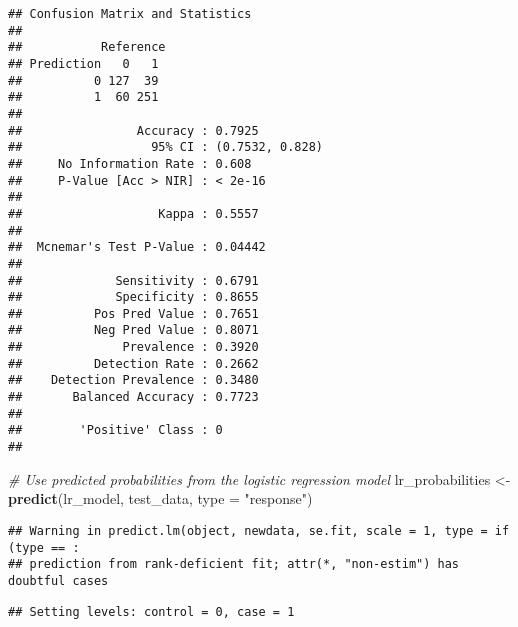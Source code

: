 \documentclass[
]{article}
\newenvironment{Shaded}{\begin{snugshade}}{\end{snugshade}}
\newcommand{\AttributeTok}[1]{\textcolor[rgb]{0.13,0.29,0.53}{#1}}
\newcommand{\CommentTok}[1]{\textcolor[rgb]{0.56,0.35,0.01}{\textit{#1}}}
\newcommand{\FloatTok}[1]{\textcolor[rgb]{0.00,0.00,0.81}{#1}}
\newcommand{\FunctionTok}[1]{\textcolor[rgb]{0.13,0.29,0.53}{\textbf{#1}}}
\newcommand{\NormalTok}[1]{#1}
\newcommand{\OtherTok}[1]{\textcolor[rgb]{0.56,0.35,0.01}{#1}}
\newcommand{\SpecialCharTok}[1]{\textcolor[rgb]{0.81,0.36,0.00}{\textbf{#1}}}
\newcommand{\StringTok}[1]{\textcolor[rgb]{0.31,0.60,0.02}{#1}}
\begin{document}
\begin{verbatim}
## Confusion Matrix and Statistics
## 
##           Reference
## Prediction   0   1
##          0 127  39
##          1  60 251
##                                          
##                Accuracy : 0.7925         
##                  95% CI : (0.7532, 0.828)
##     No Information Rate : 0.608          
##     P-Value [Acc > NIR] : < 2e-16        
##                                          
##                   Kappa : 0.5557         
##                                          
##  Mcnemar's Test P-Value : 0.04442        
##                                          
##             Sensitivity : 0.6791         
##             Specificity : 0.8655         
##          Pos Pred Value : 0.7651         
##          Neg Pred Value : 0.8071         
##              Prevalence : 0.3920         
##          Detection Rate : 0.2662         
##    Detection Prevalence : 0.3480         
##       Balanced Accuracy : 0.7723         
##                                          
##        'Positive' Class : 0              
## 
\end{verbatim}

\begin{Shaded}
\begin{Highlighting}[]
\CommentTok{\# Use predicted probabilities from the logistic regression model}
\NormalTok{lr\_probabilities }\OtherTok{\textless{}{-}} \FunctionTok{predict}\NormalTok{(lr\_model, test\_data, }\AttributeTok{type =} \StringTok{"response"}\NormalTok{)}
\end{Highlighting}
\end{Shaded}

\begin{verbatim}
## Warning in predict.lm(object, newdata, se.fit, scale = 1, type = if (type == :
## prediction from rank-deficient fit; attr(*, "non-estim") has doubtful cases
\end{verbatim}

\begin{Shaded}
\end{Shaded}

\begin{verbatim}
## Setting levels: control = 0, case = 1
\end{verbatim}
\end{document}
